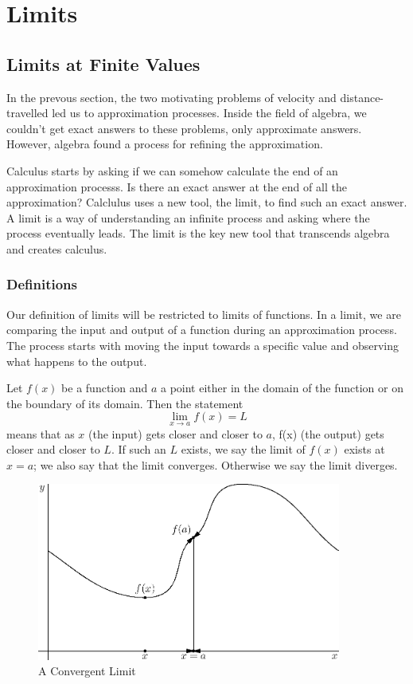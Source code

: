 \documentclass[fleqn]{report}
\begin{document}
\chapter{Limits}
\label{limits}

\section{Limits at Finite Values}
\label{finite-values}

In the prevous section, the two motivating problems of
velocity and distance-travelled led us to approximation
processes. Inside the field of algebra, we couldn't get exact
answers to these problems, only approximate answers. 
However, algebra found a process for refining the approximation. 

Calculus starts by asking if we can somehow calculate the end
of an approximation processs. Is there an exact answer at the
end of all the approximation? Calclulus uses a new tool, the
limit, to find such an exact answer. A limit is a way of
understanding an infinite process and asking where the process
eventually leads.  The limit is the key new tool that
transcends algebra and creates calculus.

\subsection{Definitions}
\label{limit-definitions}

Our definition of limits will be restricted to limits of
functions. In a limit, we are comparing the input and output
of a function during an approximation process. The process
starts with moving the input towards a specific value and
observing what happens to the output.

Let $f(x)$ be a function and $a$ a point either in the domain
of the function or on the boundary of its domain. Then the
statement 
\begin{equation*}
\lim_{x \rightarrow a} f(x) = L
\end{equation*}
means that as $x$ (the input) gets closer and closer to $a$,
f(x) (the output) gets closer and closer to $L$. If such an
$L$ exists, we say the limit of $f(x)$ exists at $x=a$; we
also say that the limit converges. Otherwise we say the limit
diverges. 

\begin{figure}[ht]
\centering
\includegraphics[width=10cm]{figure18.eps}
\caption{A Convergent Limit}
\label{figure-convergent-limit}
\end{figure}
\end{document}
